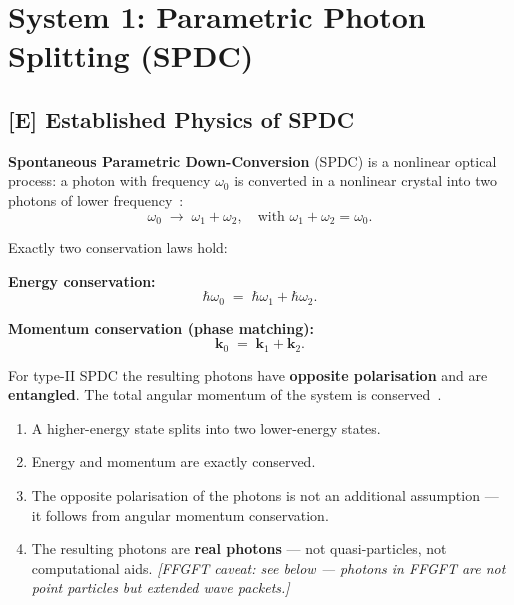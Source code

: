 \section{System 1: Parametric Photon Splitting (SPDC)}
\label{sec:spdc}

\subsection{[E] Established Physics of SPDC}

\textbf{Spontaneous Parametric Down-Conversion} (SPDC) is a
nonlinear optical process: a photon with frequency $\omega_0$
is converted in a nonlinear crystal into two photons
of lower frequency~\cite{Burnham1970}:
\begin{equation}
  \omega_0 \;\longrightarrow\; \omega_1 + \omega_2,
  \quad \text{with } \omega_1 + \omega_2 = \omega_0.
\end{equation}

Exactly two conservation laws hold:

\textbf{Energy conservation:}
\begin{equation}
  \hbar\omega_0 \;=\; \hbar\omega_1 + \hbar\omega_2.
\end{equation}

\textbf{Momentum conservation (phase matching):}
\begin{equation}
  \mathbf{k}_0 \;=\; \mathbf{k}_1 + \mathbf{k}_2.
\end{equation}

For type-II SPDC the resulting photons have
\textbf{opposite polarisation} and are \textbf{entangled}.
The total angular momentum of the system is conserved~\cite{Kwiat1995}.

\begin{keyresult}
\begin{enumerate}
  \item A higher-energy state splits into two
    lower-energy states.
  \item Energy and momentum are exactly conserved.
  \item The opposite polarisation of the photons
    is not an additional assumption --- it follows from
    angular momentum conservation.
  \item The resulting photons are \textbf{real photons}
    --- not quasi-particles, not computational aids.
    \emph{[FFGFT caveat: see below --- photons in FFGFT
    are not point particles but extended wave packets.]}
\end{enumerate}
\end{keyresult}

